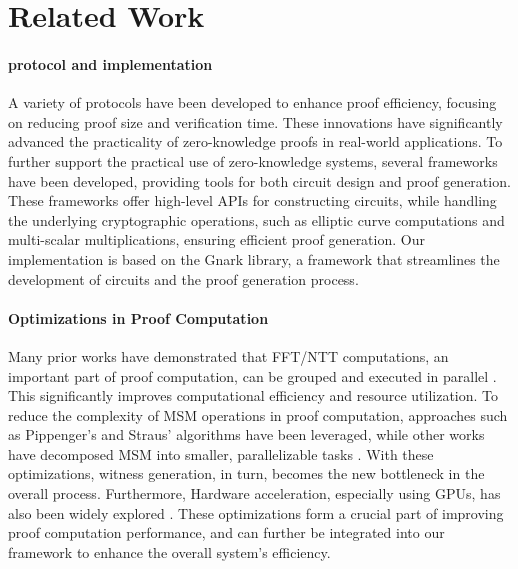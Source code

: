 \vspace{-5pt}
\section{Related Work}\label{sec:related_work}
\paragraph{\zk protocol and implementation}
A variety of \zk protocols\cite{groth2016size, gabizon2019plonk, chen2023hyperplonk, setty2020spartan, chiesa2020marlin, wahby2018doubly, bunz2018bulletproofs} have been developed to enhance proof efficiency, focusing on reducing proof size and verification time. These innovations have significantly advanced the practicality of zero-knowledge proofs in real-world applications. To further support the practical use of zero-knowledge systems, several frameworks\cite{gnark, libsnark, circom} have been developed, providing tools for both circuit design and proof generation. These frameworks offer high-level APIs for constructing circuits, while handling the underlying cryptographic operations, such as elliptic curve computations and multi-scalar multiplications, ensuring efficient proof generation. Our implementation is based on the Gnark library, a framework that streamlines the development of \zk circuits and the proof generation process.


\paragraph{Optimizations in Proof Computation}  
Many prior works have demonstrated that FFT/NTT computations, an important part of proof computation,  can be grouped and executed in parallel \cite{chen2017big, dai2016cuhe, goey2021accelerating, kim2020accelerating}. This significantly improves computational efficiency and resource utilization. To reduce the complexity of MSM operations in proof computation, approaches such as Pippenger’s \cite{pippenger1976evaluation} and Straus’ \cite{straus1964addition} algorithms have been leveraged, while other works have decomposed MSM into smaller, parallelizable tasks \cite{zhang2021pipezk, ma2023gzkp}. 
With these optimizations, witness generation, in turn, becomes the new bottleneck in the overall process.  Furthermore, Hardware acceleration, especially using GPUs, has also been widely explored \cite{chen2017big, dai2016cuhe, goey2021accelerating, kim2020accelerating, ma2023gzkp, zhang2021pipezk, ji2024accelerating, govindaraju2008high}. These optimizations form a crucial part of improving proof computation performance, and can further be integrated into our framework to enhance the overall system's efficiency.

